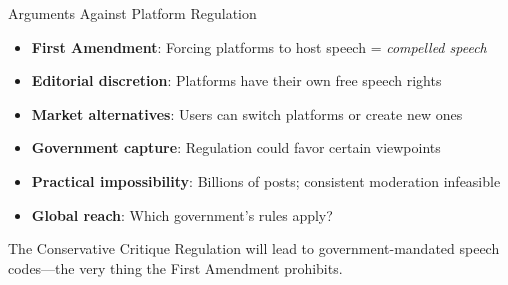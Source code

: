﻿\documentclass[aspectratio=169]{beamer}
\begin{document}
\begin{frame}{Arguments Against Platform Regulation}
\begin{itemize}
    \item \textbf{First Amendment}: Forcing platforms to host speech = \textit{compelled speech}
    
    \item \textbf{Editorial discretion}: Platforms have their own free speech rights
    
    \item \textbf{Market alternatives}: Users can switch platforms or create new ones
    
    \item \textbf{Government capture}: Regulation could favor certain viewpoints
    
    \item \textbf{Practical impossibility}: Billions of posts; consistent moderation infeasible
    
    \item \textbf{Global reach}: Which government's rules apply?
\end{itemize}

\vspace{0.3cm}
\begin{alertblock}{The Conservative Critique}
Regulation will lead to government-mandated speech codes---the very thing the First Amendment prohibits.
\end{alertblock}
\end{frame}
\end{document}
